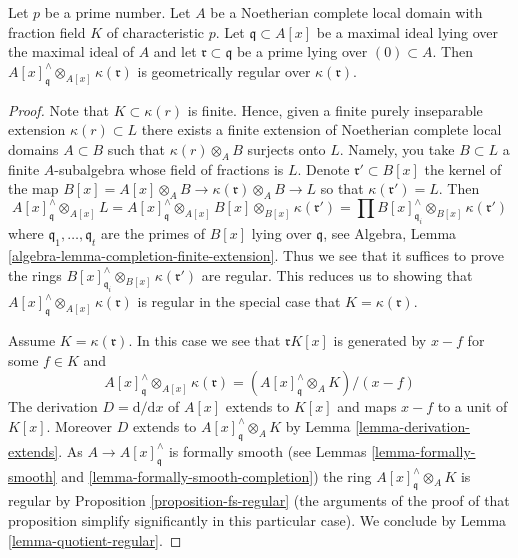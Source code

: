 \begin{lemma}
\label{lemma-another-helper-G-ring}
Let $p$ be a prime number. Let $A$ be a Noetherian complete local domain
with fraction field $K$ of characteristic $p$. Let $\mathfrak q \subset A[x]$
be a maximal ideal lying over the maximal ideal of $A$ and let
$\mathfrak r \subset \mathfrak q$ be a prime lying over $(0) \subset A$. Then
$A[x]_\mathfrak q^\wedge \otimes_{A[x]} \kappa(\mathfrak r)$ is geometrically
regular over $\kappa(\mathfrak r)$.
\end{lemma}

\begin{proof}
Note that $K \subset \kappa(r)$ is finite. Hence, given a finite purely
inseparable extension $\kappa(r) \subset L$ there exists a finite
extension of Noetherian complete local domains $A \subset B$ such that
$\kappa(r) \otimes_A B$ surjects onto $L$. Namely, you take $B \subset L$
a finite $A$-subalgebra whose field of fractions is $L$. Denote
$\mathfrak r' \subset B[x]$ the kernel of the map
$B[x] = A[x] \otimes_A B \to \kappa(\mathfrak r) \otimes_A B \to L$
so that $\kappa(\mathfrak r') = L$. Then
$$
A[x]_\mathfrak q^\wedge \otimes_{A[x]} L =
A[x]_\mathfrak q^\wedge \otimes_{A[x]} B[x]
\otimes_{B[x]} \kappa(\mathfrak r') =
\prod B[x]_{\mathfrak q_i}^\wedge \otimes_{B[x]} \kappa(\mathfrak r')
$$
where $\mathfrak q_1, \ldots, \mathfrak q_t$ are the primes of $B[x]$
lying over $\mathfrak q$, see
Algebra, Lemma \ref{algebra-lemma-completion-finite-extension}.
Thus we see that it suffices to prove the rings
$B[x]_{\mathfrak q_i}^\wedge \otimes_{B[x]} \kappa(\mathfrak r')$
are regular. This reduces us to showing that
$A[x]_\mathfrak q^\wedge \otimes_{A[x]} \kappa(\mathfrak r)$
is regular in the special case that $K = \kappa(\mathfrak r)$.

\medskip\noindent
Assume $K = \kappa(\mathfrak r)$. In this case we see that
$\mathfrak r K[x]$ is generated by $x - f$ for some $f \in K$
and
$$
A[x]_\mathfrak q^\wedge \otimes_{A[x]} \kappa(\mathfrak r)
=
(A[x]_\mathfrak q^\wedge \otimes_A K)/(x - f)
$$
The derivation $D = \text{d}/\text{d}x$ of $A[x]$ extends to $K[x]$ and
maps $x - f$ to a unit of $K[x]$. Moreover $D$ extends to
$A[x]_\mathfrak q^\wedge \otimes_A K$ by Lemma \ref{lemma-derivation-extends}.
As $A \to A[x]_\mathfrak q^\wedge$ is formally smooth (see
Lemmas \ref{lemma-formally-smooth} and
\ref{lemma-formally-smooth-completion})
the ring $A[x]_\mathfrak q^\wedge \otimes_A K$ is regular by
Proposition \ref{proposition-fs-regular} (the arguments of the
proof of that proposition simplify significantly in this particular case).
We conclude by Lemma \ref{lemma-quotient-regular}.
\end{proof}

